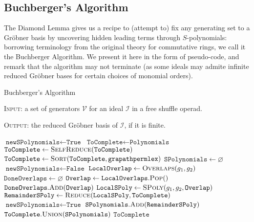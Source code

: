 \documentclass[fleqn, a4paper, twoside]{article}
\newcommand{\0}{\langle 0\rangle}
\newcommand{\II}{\mathcal{I}}
\DeclareRobustCommand{\[}{\begin{equation}}%
\DeclareRobustCommand{\]}{\end{equation}}%
\theoremstyle{mytheorem}
\theoremstyle{introthm}
\theoremstyle{mydefinition}
\theoremstyle{mydefinition2}
\theoremstyle{plain} %
\newcommand{\?}{\,?\,}
\theoremstyle{mytheorem}
\theoremstyle{plain} %
\begin{document}
\subsection{Buchberger's Algorithm}

The Diamond Lemma gives us a recipe to (attempt to) fix any 
generating set to a Gr\"obner basis by uncovering hidden
leading terms through $S$-polynomials: borrowing terminology
from the original theory for commutative rings, we call it
the Buchberger Algorithm. We present it here in the form
of pseudo-code, and remark that the algorithm may not
terminate (as some ideals may admite infinite reduced 
Gr\"obner bases for certain choices of monomial orders).

 \begin{algorithm}
\caption{Buchberger's Algorithm}\label{algo:self-reduce}
\textsc{Input:} a set of generators $\mathcal V$ for an ideal $\II$
in a free shuffle operad.

\textsc{Output:} the reduced Gr\"obner basis of $\II$,
if it is finite.

\begin{adjustwidth}{0 cm}{2 cm}
\begin{algorithmic}[1]
	\State $\texttt{newSPolynomials} \gets \texttt{True}$
	\State $\texttt{ToComplete} \gets \texttt{Polynomials}$
		\State $\texttt{ToComplete} \gets 
					\textsc{SelfReduce}(\texttt{ToComplete})$
		\State $\texttt{ToComplete} 
					\gets \textsc{Sort}(\texttt{ToComplete},
								\texttt{grapathpermlex})$
		\State $\texttt{SPolynomials} \gets \varnothing$
		\State $\texttt{newSPolynomials} \gets \texttt{False}$
			\State $\texttt{LocalOverlap}\gets
			 \textsc{Overlaps}(g_1,g_2)$
			 \State $\texttt{DoneOverlaps} \gets \varnothing$
			\State $\texttt{Overlap} \gets 	
				\texttt{LocalOverlaps}.\textsc{Pop}()$
			\State $\texttt{DoneOverlaps}.\textsc{Add}(\texttt{Overlap})$
			\State $\texttt{LocalSPoly} \gets 
				\textsc{SPoly}(g_1,g_2,\texttt{Overlap}) $
			\State $\texttt{RemainderSPoly} \gets \textsc{Reduce}(
			\texttt{LocalSPoly},\texttt{ToComplete})$
				\State $\texttt{newSPolynomials} 
					\gets \texttt{True}$
				\State $\texttt{SPolynomials}.
					\textsc{Add}(\texttt{RemainderSPoly})$
				\EndIf
				\EndWhile
			\EndFor
			\State  
				$\texttt{ToComplete}.\textsc{Union}(\texttt{SPolynomials})$
\EndWhile
\State \Return $\texttt{ToComplete}$
\EndProcedure
\end{algorithmic}
\end{adjustwidth}
\end{algorithm}
\end{document}

